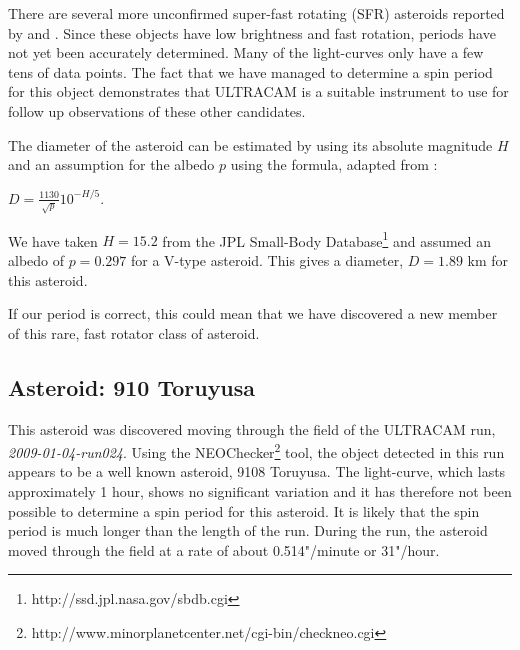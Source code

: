 There are several more unconfirmed super-fast rotating (SFR) asteroids reported by \citet{Masiero2009} and \citet{Dermawan2011}. Since these objects have low brightness and fast rotation, periods have not yet been accurately determined. Many of the light-curves only have a few tens of data points. The fact that we have managed to determine a spin period for this object demonstrates that ULTRACAM is a suitable instrument to use for follow up observations of these other candidates.  

The diameter of the asteroid can be estimated by using its absolute magnitude $H$ and an assumption for the albedo $p$ using the formula, adapted from \citet{Jewitt2013}:

$D = \frac{1130}{\sqrt{p}}10^{-H/5}.$

We have taken $H = 15.2$ from the JPL Small-Body Database\footnote{http://ssd.jpl.nasa.gov/sbdb.cgi} and assumed an albedo of $ p = 0.297$ for a V-type asteroid. This gives a diameter, $D = 1.89$ km for this asteroid. 

If our period is correct, this could mean that we have discovered a new member of this rare, fast rotator class of asteroid. 

\subsection{Asteroid: 910 Toruyusa}
  
This asteroid was discovered moving through the field of the ULTRACAM run, \emph{ 2009-01-04-run024}. Using the NEOChecker\footnote{http://www.minorplanetcenter.net/cgi-bin/checkneo.cgi} tool, the object detected in this run appears to be a well known asteroid, 9108 Toruyusa. The light-curve, which lasts approximately 1 hour, shows no significant variation and it has therefore not been possible to determine a spin period for this asteroid. It is likely that the spin period is much longer than the length of the run. During the run, the asteroid moved through the field at a rate of about  0.514"/minute or 31"/hour. 

 
